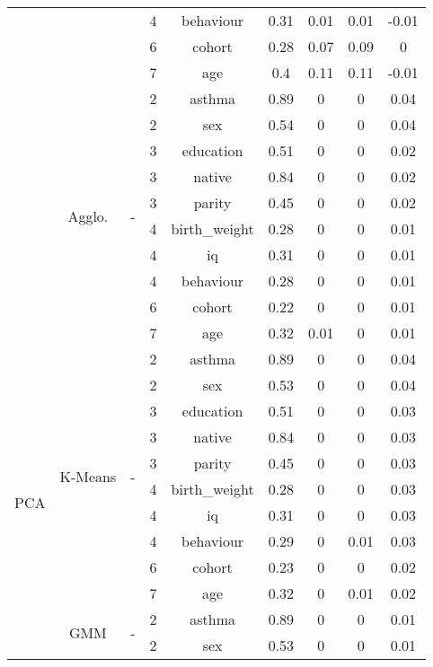 \documentclass[CAT,BIB]{TFUOC}%
\begin{document}
\begin{table}
\begin{tabular}{@{}ccccccccc@{}}
            &  &  & 4 & behaviour & 0.31 & 0.01 & 0.01 & -0.01 \\
            &  &  & 6 & cohort & 0.28 & 0.07 & 0.09 & 0 \\
            &  &  & 7 & age & 0.4 & 0.11 & 0.11 & -0.01 \\ \cmidrule(l){2-9}
            & \multirow{10}{*}{Agglo.} & \multirow{10}{*}{-} & 2 & asthma & 0.89 & 0 & 0 & 0.04 \\
            &  &  & 2 & sex & 0.54 & 0 & 0 & 0.04 \\
            &  &  & 3 & education & 0.51 & 0 & 0 & 0.02 \\
            &  &  & 3 & native & 0.84 & 0 & 0 & 0.02 \\
            &  &  & 3 & parity & 0.45 & 0 & 0 & 0.02 \\
            &  &  & 4 & birth\_weight & 0.28 & 0 & 0 & 0.01 \\
            &  &  & 4 & iq & 0.31 & 0 & 0 & 0.01 \\
            &  &  & 4 & behaviour & 0.28 & 0 & 0 & 0.01 \\
            &  &  & 6 & cohort & 0.22 & 0 & 0 & 0.01 \\
            &  &  & 7 & age & 0.32 & 0.01 & 0 & 0.01 \\ \midrule
            \multirow{30}{*}{PCA} & \multirow{10}{*}{K-Means} & \multirow{10}{*}{-} & 2 & asthma & 0.89 & 0 & 0 & 0.04 \\
            &  &  & 2 & sex & 0.53 & 0 & 0 & 0.04 \\
            &  &  & 3 & education & 0.51 & 0 & 0 & 0.03 \\
            &  &  & 3 & native & 0.84 & 0 & 0 & 0.03 \\
            &  &  & 3 & parity & 0.45 & 0 & 0 & 0.03 \\
            &  &  & 4 & birth\_weight & 0.28 & 0 & 0 & 0.03 \\
            &  &  & 4 & iq & 0.31 & 0 & 0 & 0.03 \\
            &  &  & 4 & behaviour & 0.29 & 0 & 0.01 & 0.03 \\
            &  &  & 6 & cohort & 0.23 & 0 & 0 & 0.02 \\
            &  &  & 7 & age & 0.32 & 0 & 0.01 & 0.02 \\ \cmidrule(l){2-9}
            & \multirow{10}{*}{GMM} & \multirow{10}{*}{-} & 2 & asthma & 0.89 & 0 & 0 & 0.01 \\
            &  &  & 2 & sex & 0.53 & 0 & 0 & 0.01 \\

\end{tabular}
\end{table}
\end{document}
